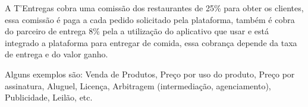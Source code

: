 A T’Entregas cobra uma comissão dos restaurantes de 25\% para obter os clientes, essa comissão é paga a cada pedido solicitado pela plataforma, também é cobra do parceiro de entrega 8\% pela a utilização do aplicativo que usar e está integrado a plataforma para entregar de comida, essa cobrança depende da taxa de entrega e do valor ganho.\par

\begin{commentA} \vspace{0.3cm} \noindent Alguns exemplos são:
Venda de Produtos, Preço por uso do produto, Preço por assinatura, Aluguel, Licença, Arbitragem (intermediação, agenciamento), Publicidade, Leilão, etc.\par \vspace{0.1cm} \end{commentA}

